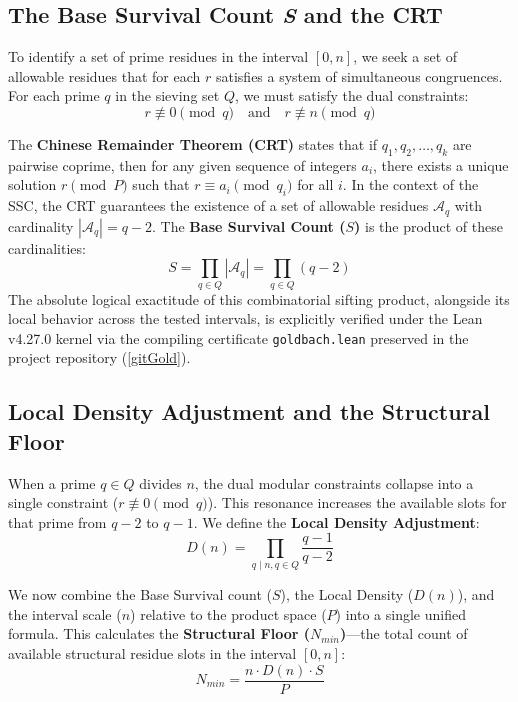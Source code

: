 \documentclass[sn-mathphys-num, pdflatex]{sn-jnl}
\begin{document}
\subsection{The Base Survival Count \textit{S} and the CRT}
\label{subsec:base_survival}

To identify a set of prime residues in the interval $[0, n]$, we seek a set of allowable residues that for each $r$ satisfies a system of simultaneous congruences. For each prime $q$ in the sieving set $Q$, we must satisfy the dual constraints:
\begin{equation}
r \not\equiv 0 \pmod{q} \quad \text{and} \quad r \not\equiv n \pmod{q}
\end{equation}

The \textbf{Chinese Remainder Theorem (CRT)} states that if $q_1, q_2, \dots, q_k$ are pairwise coprime, then for any given sequence of integers $a_i$, there exists a unique solution $r \pmod{P}$ such that $r \equiv a_i \pmod{q_i}$ for all $i$. In the context of the SSC, the CRT guarantees the existence of a set of allowable residues $\mathcal{A}_q$ with cardinality $|\mathcal{A}_q| = q-2$. The \textbf{Base Survival Count ($S$)} is the product of these cardinalities:
\begin{equation}
S = \prod_{q \in Q} |\mathcal{A}_q| = \prod_{q \in Q} (q - 2)
\end{equation}
The absolute logical exactitude of this combinatorial sifting product, alongside its local behavior across the tested intervals, is explicitly verified under the Lean v4.27.0 kernel via the compiling certificate \texttt{goldbach.lean} preserved in the project repository (\ref{gitGold}).

\subsection{Local Density Adjustment and the Structural Floor}
\label{subsec:local_density}

When a prime $q \in Q$ divides $n$, the dual modular constraints collapse into a single constraint ($r \not\equiv 0 \pmod{q}$). This resonance increases the available slots for that prime from $q-2$ to $q-1$. We define the \textbf{Local Density Adjustment}:
\begin{equation}
D(n) = \prod_{q \mid n, q \in Q} \frac{q - 1}{q - 2}
\end{equation}

We now combine the Base Survival count ($S$), the Local Density ($D(n)$), and the interval scale ($n$) relative to the product space ($P$) into a single unified formula. This calculates the \textbf{Structural Floor ($N_{min}$)}—the total count of available structural residue slots in the interval $[0, n]$:
\begin{equation}
\label{eq:structural_floor}
N_{min} = \frac{n \cdot D(n) \cdot S}{P}
\end{equation}
\end{document}
